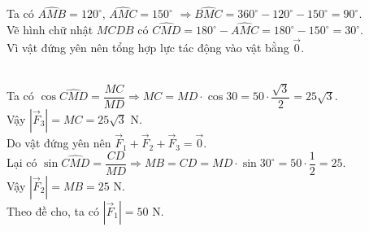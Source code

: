 \begin{ex}
{\begin{center}
		\end{center}
		Ta có $\widehat{AMB}=120^{\circ}$, $\widehat{AMC}=150^{\circ}$ $\Rightarrow \widehat{BMC}=360^{\circ}-120^{\circ}-150^{\circ}=90^{\circ}$.\\
		Vẽ hình chữ nhật $MCDB$ có $\widehat{CMD}=180^{\circ}-\widehat{AMC}=180^{\circ}-150^{\circ}=30^{\circ}$.\\
		Vì vật đứng yên nên tổng hợp lực tác động vào vật bằng $\overrightarrow{0}$.
		\begin{itemchoice}
		\\ Ta có $\cos \widehat{CMD}=\dfrac{MC}{MD} \Rightarrow MC=MD \cdot \cos 30 =50 \cdot \dfrac{\sqrt{3}}{2}=25\sqrt{3}$.\\
			Vậy $\left|\overrightarrow{F}_3\right|=MC=25\sqrt{3}$ N.
		\\ Do vật đứng yên nên $\overrightarrow{F}_1+\overrightarrow{F}_2+\overrightarrow{F}_3=\overrightarrow{0}$.
		\\ Lại có $\sin \widehat{CMD}=\dfrac{CD}{MD} \Rightarrow MB=CD=MD \cdot \sin 30^{\circ}=50 \cdot \dfrac{1}{2}=25$.\\
			Vậy $\left|\overrightarrow{F}_2\right|=MB=25$ N.
		\\ Theo đề cho, ta có $\left|\overrightarrow{F}_1\right|=50$ N.
		\end{itemchoice}
	}
\end{ex}

